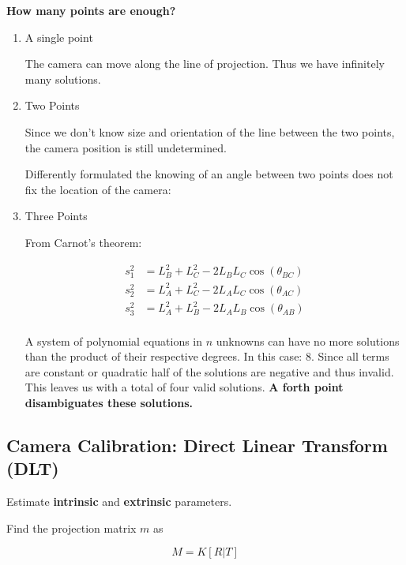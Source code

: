 \documentclass[10pt,a4paper]{scrartcl}
\begin{document}
\begin{multicols*}{2}
\textbf{How many points are enough?}

\begin{enumerate}
\item A single point


The camera can move along the line of projection. Thus we have infinitely many solutions.

\item Two Points


Since we don't know size and orientation of the line between the two points, the camera position is still undetermined.

Differently formulated the knowing of an angle between two points does not fix the location of the camera:


\item Three Points


From Carnot's theorem:

\begin{align*}
s_1^2&=L_B^2+L_C^2-2L_BL_C\cos(\theta_{BC})\\
s_2^2&=L_A^2+L_C^2-2L_AL_C\cos(\theta_{AC})\\
s_3^2&=L_A^2+L_B^2-2L_AL_B\cos(\theta_{AB})\\
\end{align*}

A system of polynomial equations in $n$ unknowns can have no more solutions than the product of their respective degrees. In this case: $8$. Since all terms are constant or quadratic half of the solutions are negative and thus invalid. This leaves us with a total of four valid solutions. \textbf{A forth point disambiguates these solutions.}

\end{enumerate}

\subsection{Camera Calibration: Direct Linear Transform (DLT)} \label{sec:DLT}

Estimate \textbf{intrinsic} and \textbf{extrinsic} parameters.

Find the projection matrix $m$ as

\begin{equation*}
M = K[R|T]
\end{equation*}


\end{multicols*}
\end{document}
